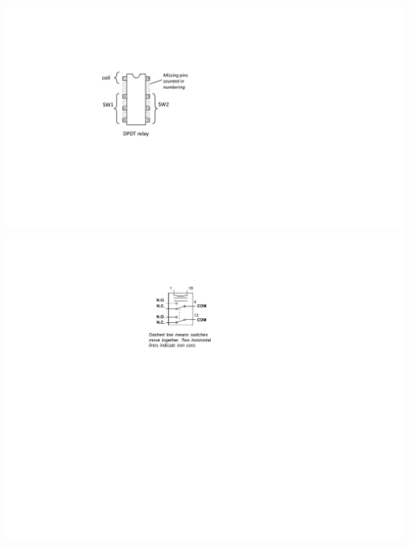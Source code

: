\begin{enumerate}[wide]
\begin{center}
\hspace{0.3in}
\includegraphics[scale=0.7]{relays/relay_pinout.pdf}
\hspace{-0.1in}
{\includegraphics{relays/relay_diagram2.pdf}}
\end{center}


\end{enumerate}
